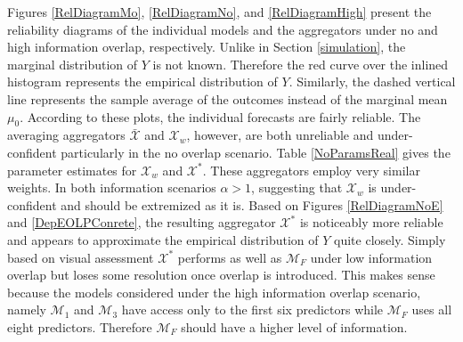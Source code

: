 \documentclass[11pt]{article}
\theoremstyle{definition}
\theoremstyle{definition}
\begin{document}
Figures \ref{RelDiagramMo}, \ref{RelDiagramNo}, and \ref{RelDiagramHigh} present the reliability diagrams of the individual models and the aggregators under no and high information overlap, respectively. Unlike in Section \ref{simulation}, the marginal distribution of $Y$ is not known. Therefore the red curve over the inlined histogram represents the empirical distribution of $Y$. Similarly, the dashed vertical line represents the sample average of the outcomes instead of the marginal mean $\mu_0$. According to these plots, the individual forecasts are fairly reliable. The averaging aggregators $\bar{\mathcal{X}}$ and $\mathcal{X}_w$, however, are both unreliable and under-confident particularly in the no overlap scenario. Table \ref{NoParamsReal} gives the parameter estimates for $\mathcal{X}_w$ and $\mathcal{X}^*$. These aggregators employ very similar weights. In both information scenarios $\alpha > 1$, suggesting that $\mathcal{X}_w$ is under-confident and should be extremized as it is. Based on Figures \ref{RelDiagramNoE} and  \ref{DepEOLPConrete}, the resulting aggregator $\mathcal{X}^*$ is noticeably more reliable and appears to approximate the empirical distribution of $Y$ quite closely. Simply based on visual assessment $\mathcal{X}^*$ performs as well as $\mathcal{M}_F$ under low information overlap but  loses some resolution once  overlap is introduced. This makes sense because the models considered under the high information overlap scenario, namely $\mathcal{M}_1$ and $\mathcal{M}_3$ have access only to the first six predictors while $\mathcal{M}_F$ uses all eight predictors. Therefore $\mathcal{M}_F$ should have a higher level of information. 
\end{document}
